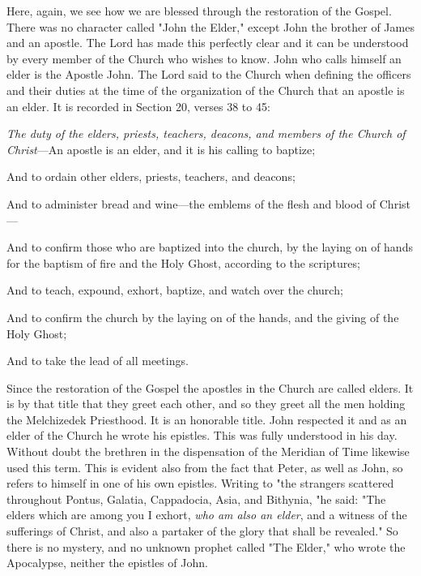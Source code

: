 Here, again, we see how we are blessed through the restoration of the Gospel. There was no
character called "John the Elder," except John the brother of James and an apostle. The Lord
has made this perfectly clear and it can be understood by every member of the Church who
wishes to know. John who calls himself an elder is the Apostle John. The Lord said to the
Church when defining the officers and their duties at the time of the organization of the
Church that an apostle is an elder. It is recorded in Section 20, verses 38 to 45:

\textit{The duty of the elders, priests, teachers, deacons, and members of the Church of Christ}—An
apostle is an elder, and it is his calling to baptize;

And to ordain other elders, priests, teachers, and deacons;

And to administer bread and wine—the emblems of the flesh and blood of Christ—

And to confirm those who are baptized into the church, by the laying on of hands for the
baptism of fire and the Holy Ghost, according to the scriptures;

And to teach, expound, exhort, baptize, and watch over the church;

And to confirm the church by the laying on of the hands, and the giving of the Holy Ghost;

And to take the lead of all meetings.

Since the restoration of the Gospel the apostles in the Church are called elders. It is by that
title that they greet each other, and so they greet all the men holding the Melchizedek
Priesthood. It is an honorable title. John respected it and as an elder of the Church he wrote
his epistles. This was fully understood in his day. Without doubt the brethren in the
dispensation of the Meridian of Time likewise used this term. This is evident also from the
fact that Peter, as well as John, so refers to himself in one of his own epistles. Writing to "the
strangers scattered throughout Pontus, Galatia, Cappadocia, Asia, and Bithynia, "he said:
"The elders which are among you I exhort, \textit{who am also an elder}, and a witness of the
sufferings of Christ, and also a partaker of the glory that shall be revealed." So there is no
mystery, and no unknown prophet called "The Elder," who wrote the Apocalypse, neither the
epistles of John.


